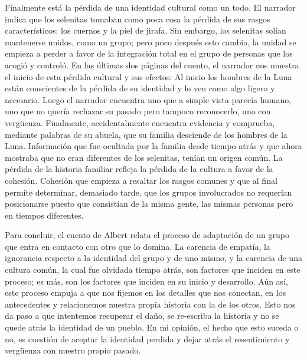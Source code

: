 \documentclass[a4paper]{tufte-handout}
\begin{document}
Finalmente está la pérdida de una identidad cultural como un todo. El narrador indica que los selenitas tomaban como poca cosa la pérdida de sus rasgos característicos: los cuernos y la piel de jirafa. Sin embargo, los selenitas solían mantenerse unidos, como un grupo; pero poco después esto cambia, la unidad se empieza a perder a favor de la integración total en el grupo de personas que los acogió y controló. En las últimas dos páginas del cuento, el narrador nos muestra el inicio de esta pérdida cultural y sus efectos: Al inicio los hombres de la Luna están conscientes de la pérdida de su identidad y lo ven como algo ligero y necesario. Luego el narrador encuentra uno que a simple vista parecía humano, uno que no quería rechazar su pasado pero tampoco reconocerlo, uno con vergüenza. Finalmente, accidentalmente encuentra evidencia y comprueba, mediante palabras de su abuela, que su familia desciende de los hombres de la Luna. Información que fue ocultada por la familia desde tiempo atrás y que ahora mostraba que no eran diferentes de los selenitas, tenían un origen común. La pérdida de la historia familiar refleja la pérdida de la cultura a favor de la cohesión. Cohesión que empieza a resaltar los rasgos comunes y que al final permite determinar, demasiado tarde, que los grupos involucrados no requerían posicionarse puesto que consistían de la misma gente, las mismas personas pero en tiempos diferentes.



\noindent
Para concluir, el cuento de Albert relata el proceso de adaptación de un grupo que entra en contacto con otro que lo domina. La carencia de empatía, la ignorancia respecto a la identidad del grupo y de uno mismo, y la carencia de una cultura común, la cual fue olvidada tiempo atrás, son factores que inciden en este proceso; es más, son los factores que inciden en su inicio y desarrollo. Aún así, este proceso empuja a que nos fijemos en los detalles que nos conectan, en los antecedentes y relacionemos nuestra propia historia con la de los otros. Esto nos da paso a que intentemos recuperar el daño, se re-escriba la historia y no se quede atrás la identidad de un pueblo. En mi opinión, el hecho que esto suceda o no, es cuestión de aceptar la identidad perdida y dejar atrás el resentimiento y vergüenza con nuestro propio pasado.

\hrulefill

\vspace{-2\baselineskip}
\end{document}
